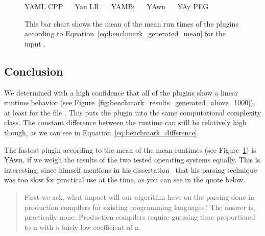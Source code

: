\begin{figure}[H]
  \begin{bchart}[max=300, width=0.8\textwidth, unit=ms]





  \end{bchart}
  \begin{center}
  \vspace{-0.5cm}
     YAML CPP ~~
     Yan LR ~~
     YAMBi ~~
     YAwn ~~
     YAy PEG
  \vspace{-0.5cm}
  \end{center}
  \caption{This bar chart shows the mean of the mean run times of the plugins according to Equation~\ref{eq:benchmark_generated_mean} for the input \FileGenerated{}.}
  \label{fig:benchmark_generated_mean}
\end{figure}

\subsection{Conclusion}

We determined with a high confidence that all of the  plugins show a linear runtime behavior (see Figure~\ref{fig:benchmark_results_generated_above_1000}), at least for the file \FileGeneratedHundredThousand{}. This puts the plugin into the same computational complexity class. The constant difference between the runtime can still be relatively high though, as we can see in Equation~\ref{eq:benchmark_difference}.

The fastest plugin according to the mean of the mean runtimes (see Figure~\ref{fig:benchmark_generated_mean}) is YAwn, if we weigh the results of the two tested operating systems equally. This is interesting, since \citeauthor{earley1970efficient} himself mentions in his dissertation~\cite[p. 122]{earley1970efficient} that his parsing technique was too slow for practical use at the time, as you can see in the quote below.

\begin{quote}
  First we ask, what impact will our algorithm have on the parsing done in production compilers for existing programming languages? The answer is, practically none. Production compilers require guessing time proportional to n with a fairly low coefficient of n.
\end{quote}

